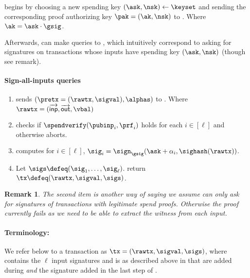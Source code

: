 \documentclass[11pt]{article}
\numberwithin{equation}{section} %
\numberwithin{figure}{section} %
\newtheorem{remark}[thm]{Remark}
\newcommand{\inps}{\ensuremath{\overrightarrow{\mathsf{inp}}}\xspace}
\newcommand{\outs}{\ensuremath{\overrightarrow{\mathsf{out}}}\xspace}
\begin{document}
\oracle begins by choosing a new spending key $(\ask,\nsk)\leftarrow \keyset$ and sending the corresponding proof authorizing key
$\pak=(\ak,\nsk)$ to \adv.  Where $\ak=\ask\cdot \gsig$.


Afterwards, 
\adv can make \signallinputs queries to \oracle,
which intuitively correspond to asking for signatures on transactions whose inputs have spending key $(\ask,\nsk)$ (though see remark). 
\paragraph{Sign-all-inputs queries}%
\begin{enumerate}
 \item \adv sends $(\pretx=(\rawtx,\sigval),\alphas)$ to \oracle.
 Where $\rawtx = (\inps,\outs,\vbal)$
 \item \oracle checks if $\spendverify(\pubinp_i,\prf_i)$ holds for each $i\in [\ell]$ and otherwise aborts.
 \item  \oracle computes for $i\in [\ell]$, $\sig_i = \sign_{\gsig}(\ask+\alpha_i,\sighash(\rawtx))$.
 \item Let $\sigs\defeq (\sig_1,\ldots,\sig_\ell)$. \oracle return $\tx\defeq(\rawtx,\sigval,\sigs)$. 
\end{enumerate}
\begin{remark}
 The second item is another way of saying we assume \adv can only ask \oracle for signatures of transactions with legitimate spend proofs.
 Otherwise the proof currently fails as we need to be able to extract the witness from each input.
\end{remark}

%  


\paragraph{Terminology:}
We refer below to a transaction \tx as $\tx=(\rawtx,\sigval,\sigs)$, where \sigs contains the $\ell$ input signatures and \sigval is as described above in 
\maketx{} 
that are added during \signallinputs \emph{and} the signature \sigval added in the last step of \maketx.
\end{document}
